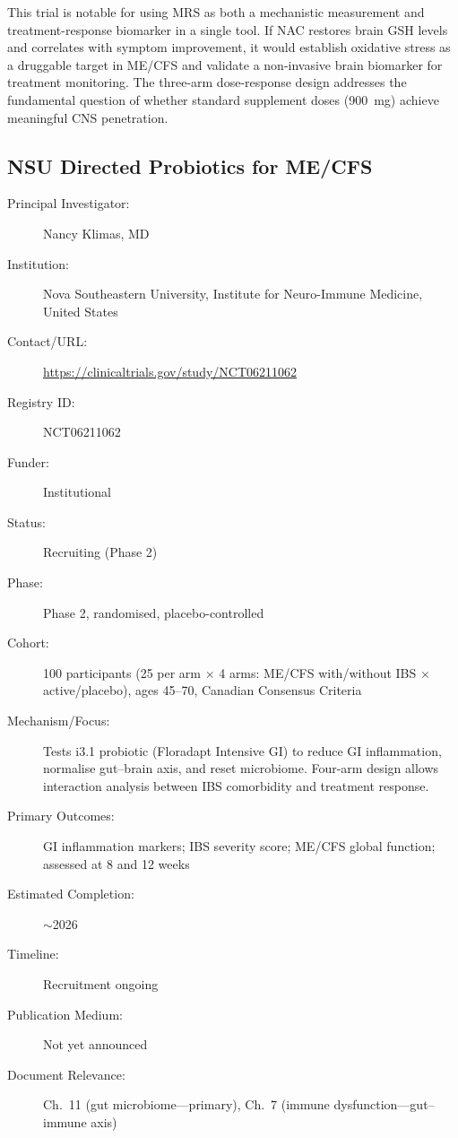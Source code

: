 This trial is notable for using MRS as both a mechanistic measurement and
treatment-response biomarker in a single tool.  If NAC restores brain GSH
levels and correlates with symptom improvement, it would establish oxidative
stress as a druggable target in ME/CFS and validate a non-invasive brain
biomarker for treatment monitoring.  The three-arm dose-response design
addresses the fundamental question of whether standard supplement doses
(900~mg) achieve meaningful CNS penetration.

\subsection{NSU Directed Probiotics for ME/CFS}
\label{sec:registry-nsu-probiotics}

\begin{description}
    \item[Principal Investigator:] Nancy Klimas, MD
    \item[Institution:] Nova Southeastern University, Institute for
        Neuro-Immune Medicine, United States
    \item[Contact/URL:] \url{https://clinicaltrials.gov/study/NCT06211062}
    \item[Registry ID:] NCT06211062
    \item[Funder:] Institutional
    \item[Status:] Recruiting (Phase 2)
    \item[Phase:] Phase 2, randomised, placebo-controlled
    \item[Cohort:] 100 participants (25 per arm $\times$ 4 arms: ME/CFS
        with/without IBS $\times$ active/placebo), ages 45--70, Canadian
        Consensus Criteria
    \item[Mechanism/Focus:] Tests i3.1 probiotic (Floradapt Intensive GI) to
        reduce GI inflammation, normalise gut--brain axis, and reset
        microbiome.  Four-arm design allows interaction analysis between
        IBS comorbidity and treatment response.
    \item[Primary Outcomes:] GI inflammation markers; IBS severity score;
        ME/CFS global function; assessed at 8 and 12 weeks
    \item[Estimated Completion:] $\sim$2026
    \item[Timeline:] Recruitment ongoing
    \item[Publication Medium:] Not yet announced
    \item[Document Relevance:] Ch.~11 (gut microbiome---primary),
        Ch.~7 (immune dysfunction---gut--immune axis)
\end{description}

